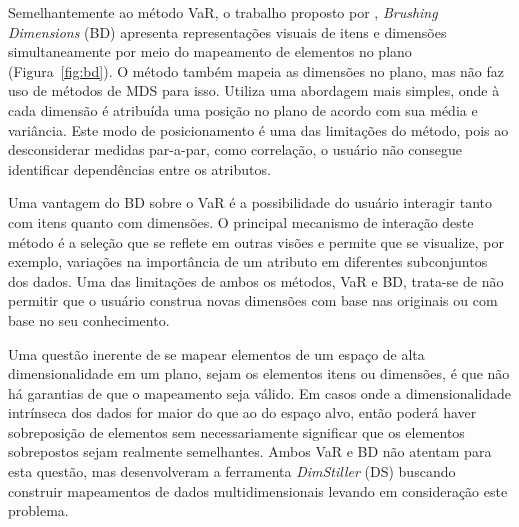 Semelhantemente ao método VaR, o trabalho proposto por
\cite{Turkay2011}, \emph{Brushing Dimensions} (BD) apresenta
representações visuais de itens e dimensões simultaneamente
por meio do mapeamento de elementos no plano
(Figura~\ref{fig:bd}). O método também mapeia as dimensões
no plano, mas não faz uso de métodos de MDS  para isso.
Utiliza uma abordagem mais simples, onde à cada dimensão é
atribuída uma posição no plano de acordo com sua média e
variância. Este modo de posicionamento é uma das limitações
do método, pois ao desconsiderar medidas par-a-par, como
correlação, o usuário não consegue identificar dependências
entre os atributos.

Uma vantagem do BD sobre o VaR é a possibilidade do usuário
interagir tanto com itens quanto com dimensões. O principal
mecanismo de interação deste método é a seleção que se
reflete em outras visões e permite que se visualize, por
exemplo, variações na importância de um atributo em
diferentes subconjuntos dos dados. Uma das limitações de
ambos os métodos, VaR e BD, trata-se de não permitir que o
usuário construa novas dimensões com base nas originais ou
com base no seu conhecimento.

Uma questão inerente de se mapear elementos de um espaço de
alta dimensionalidade em um plano, sejam os elementos itens
ou dimensões, é que não há garantias de que o mapeamento
seja válido. Em casos onde a dimensionalidade intrínseca dos
dados for maior do que ao do espaço alvo, então poderá haver
sobreposição de elementos sem necessariamente significar que
os elementos sobrepostos sejam realmente semelhantes. Ambos
VaR e BD não atentam para esta questão, mas
\cite{Ingram2010} desenvolveram a ferramenta
\emph{DimStiller} (DS) buscando construir mapeamentos de
dados multidimensionais levando em consideração este
problema. 

